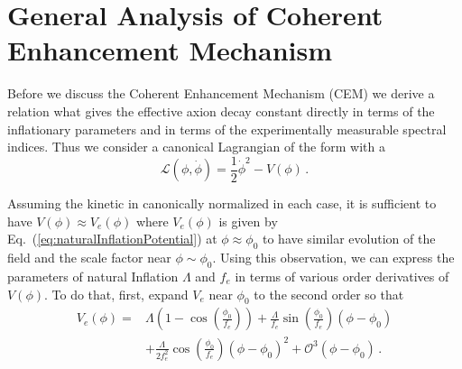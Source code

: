 \documentclass[12pt]{article}
\begin{document}
\section{General Analysis of Coherent Enhancement Mechanism \label{sec:CoherentEnhancement}}
Before we discuss the Coherent Enhancement Mechanism (CEM) we derive a relation what gives the effective axion decay constant directly in terms of the inflationary parameters and in terms of the experimentally measurable spectral indices.
Thus we consider a canonical Lagrangian of the form with a
\begin{equation}
  \mathcal{L}\left(\phi, \dot{\phi}\right) = \frac{1}{2}{\dot{\phi}}^2 - V\left(\phi\right)\,.
\end{equation}

Assuming the kinetic in canonically normalized in each case, it is sufficient to have $V\left(\phi\right) \approx V_{e}\left(\phi\right)$ where $V_{e}\left(\phi\right)$ is given by Eq.~(\ref{eq:naturalInflationPotential}) at $\phi \approx \phi_0$ to have similar evolution of the field and the scale factor near $\phi \sim \phi_0$.
Using this observation, we can express the parameters of natural Inflation $\Lambda$ and $f_e$ in terms of various order derivatives of $V\left(\phi\right)$.
To do that, first, expand $V_{e}$ near $\phi_0$ to the second order so that
\begin{equation} \label{eq:naturalInflationSeries}
  \begin{split}
    V_{e}\left(\phi\right) =
      &\Lambda \left(1 - \cos\left(\frac{\phi_0}{f_e}\right)\right)
        + \frac{\Lambda}{f_e} \sin\left(\frac{\phi_0}{f_e}\right) \left(\phi - \phi_0\right)\\
      & + \frac{\Lambda}{2 f_e^2} \cos\left(\frac{\phi_0}{f_e}\right) \left(\phi - \phi_0\right)^2
        + \mathcal{O}^3\left(\phi - \phi_0\right)\,.
  \end{split}
\end{equation}
\end{document}
